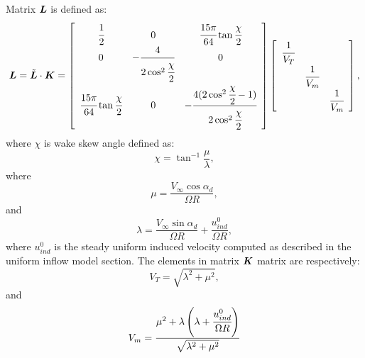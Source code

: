 Matrix $\bm{L}$ is defined as:
\begin{equation}
\bm{L} = \tilde{\bm{L}} \cdot \bm{K} = 
\left[
\begin{array}{ccc}
\cfrac{1}{2} & 0 & \cfrac{15 \pi}{64} \tan{\cfrac{\chi}{2}} \\
 0 & -\cfrac{4}{2 \cos^2{\cfrac{\chi}{2}}} & 0 \\
\cfrac{15 \pi}{64} \tan{\cfrac{\chi}{2}} & 0 &
-\cfrac{4 ( 2 \cos^2{\cfrac{\chi}{2}} - 1 ) }{2 \cos^2{\cfrac{\chi}{2}}}
\end{array}
\right] \left[
\begin{array}{ccc}
\cfrac{1}{V_T} & & \\
& \cfrac{1}{V_m} & \\
& & \cfrac{1}{V_m}
\end{array}
\right],
\end{equation}
where $\chi$ is wake skew angle defined as:
\begin{equation}
\chi = \tan^{-1}{\frac{\mu}{\lambda}},
\end{equation}
where 
\begin{equation}
\mu = \frac{ V_\infty \cos{\alpha_d}}{\Omega R},
\end{equation}
and
\begin{equation}
\lambda = \frac{ V_\infty \sin{\alpha_d}}{\Omega R} + 
\frac{u_{ind}^{0}}{\Omega R},
\end{equation}
where $u_{ind}^{0}$ is the steady uniform induced velocity
computed as described in the uniform inflow model section.
The elements in matrix $\bm{K}$ matrix are respectively:
\begin{equation}
V_T = \sqrt{\lambda^2 + \mu^2},
\end{equation}
and
\begin{equation}
V_m = \frac{\mu^2 + \lambda \left( \lambda + \cfrac{u_{ind}^{0}}{\Omega R} \right)}
{\sqrt{\lambda^2 + \mu^2}}
\end{equation}


